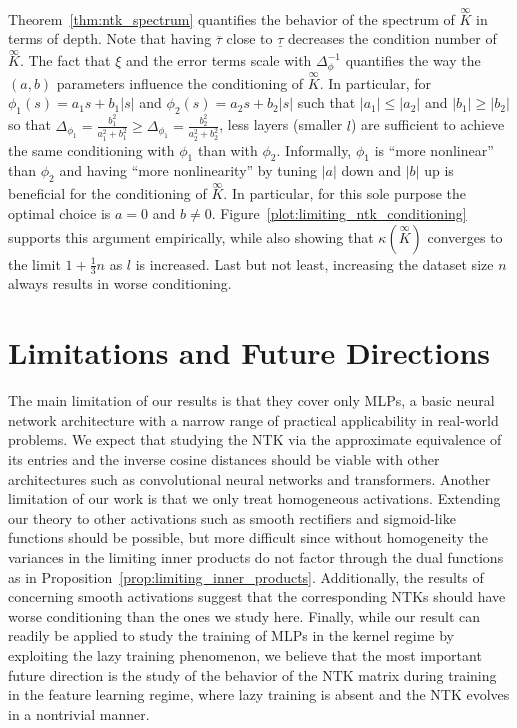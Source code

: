 \documentclass[twoside,11pt]{article}
\newcommand{\limiting}[1]{\overset{\scriptscriptstyle\infty}{#1}}
\begin{document}
\begin{remark}[Spectral scaling of $\limiting{K}$ at the EOC]\label{remark:limiting_ntk_spectral_scaling}~\\
Theorem~\ref{thm:ntk_spectrum} quantifies the behavior of the spectrum of $\limiting{K}$ in terms of depth. Note that having $\overline{\tau}$ close to $\underline{\tau}$ decreases the condition number of $\limiting{K}$. The fact that $\xi$ and the error terms scale with $\Delta_\phi^{-1}$ quantifies the way the $(a,b)$ parameters influence the conditioning of $\limiting{K}$. In particular, for $\phi_1(s) = a_1 s + b_1 \vert s \vert$ and $\phi_2(s) = a_2 s + b_2 \vert s \vert$ such that $\vert a_1 \vert \leq \vert a_2 \vert$ and $\vert b_1 \vert \geq \vert b_2 \vert$ so that $\Delta_{\phi_1} = \frac{b_1^2}{a_1^2+b_1^2} \geq \Delta_{\phi_1} = \frac{b_2^2}{a_2^2+b_2^2}$, less layers (smaller $l$) are sufficient to achieve the same conditioning with $\phi_1$ than with $\phi_2$. Informally, $\phi_1$ is ``more nonlinear'' than $\phi_2$ and having ``more nonlinearity'' by tuning $\vert a \vert$ down and $\vert b \vert$ up is beneficial for the conditioning of $\limiting{K}$. In particular, for this sole purpose the optimal choice is $a=0$ and $b \neq 0$. Figure~\ref{plot:limiting_ntk_conditioning} supports this argument empirically, while also showing that $\kappa(\limiting{K})$ converges to the limit $1 + \frac{1}{3} n$ as $l$ is increased. Last but not least, increasing the dataset size $n$ always results in worse conditioning.
\end{remark}

\section{Limitations and Future Directions} \label{limitations}
The main limitation of our results is that they cover only MLPs, a basic neural network architecture with a narrow range of practical applicability in real-world problems. We expect that studying the NTK via the approximate equivalence of its entries and the inverse cosine distances should be viable with other architectures such as convolutional neural networks and transformers. Another limitation of our work is that we only treat homogeneous activations. Extending our theory to other activations such as smooth rectifiers and sigmoid-like functions should be possible, but more difficult since without homogeneity the variances in the limiting inner products do not factor through the dual functions as in Proposition~\ref{prop:limiting_inner_products}. Additionally, the results of \citet{Xiaoetal2020} concerning smooth activations suggest that the corresponding NTKs should have worse conditioning than the ones we study here. Finally, while our result can readily be applied to study the training of MLPs in the kernel regime by exploiting the lazy training phenomenon, we believe that the most important future direction is the study of the behavior of the NTK matrix during training in the feature learning regime, where lazy training is absent and the NTK evolves in a nontrivial manner.
\end{document}
